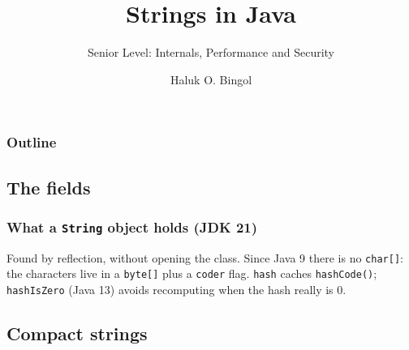 \documentclass[aspectratio=169,10pt,compress]{beamer}
\title{Strings in Java}
\subtitle{Senior Level: Internals, Performance and Security}
\author[Bingol]{Haluk O. Bingol}
\institute[FCIS]{
    Faculty of Computer and Information Sciences\\
    Yeditepe University
}
\date{
	{\tiny \hbTimeStamp}
}
\begin{document}
\begin{frame}[t,fragile]
  \titlepage
\end{frame}




\begin{frame}[t,fragile] \frametitle{Outline}
  \tableofcontents[hideallsubsections]
\end{frame}


\subsection[Fields]{The fields}




\begin{frame}[t,fragile] \frametitle{What a \texttt{String} object holds (JDK 21)}

  \vspace{0.3em}
  \small Found by reflection, without opening the class. Since Java 9 there is no \texttt{char[]}: the characters live in a
  \texttt{byte[]} plus a \texttt{coder} flag. \texttt{hash} caches \texttt{hashCode()}; \texttt{hashIsZero} (Java 13) avoids
  recomputing when the hash really is 0.
\end{frame}

\subsection[Compact]{Compact strings}
\end{document}
